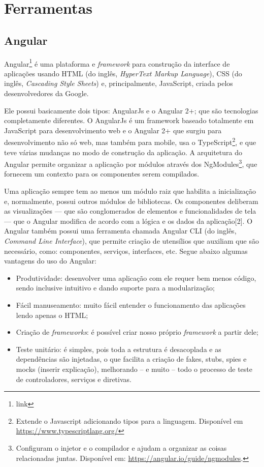 \section{Ferramentas}
\label{sec:ferramentas}

\subsection{Angular}
\label{ssec:Angular}
Angular\footnote{link}\cite{afonso2018angular} é uma plataforma e \textit{framework} para construção da interface de aplicações usando HTML (do inglês, \textit{HyperText Markup Language}), CSS (do inglês, \textit{Cascading Style Sheets}) e, principalmente, JavaScript, criada pelos desenvolvedores da Google. 

Ele possui basicamente dois tipos: AngularJs e o Angular 2+; que são tecnologias completamente diferentes. O AngularJs é um framework baseado totalmente em JavaScript para desenvolvimento web e o Angular 2+ que surgiu para desenvolvimento não só web, mas também para mobile, usa o TypeScript\footnote{Extende o Javascript adicionando tipos para a linguagem. Disponível em \url{https://www.typescriptlang.org/}}, e que teve várias mudanças no modo de construção da aplicação. A arquitetura do Angular permite organizar a aplicação por módulos através dos NgModules\footnote{Configuram o injetor e o compilador e ajudam a organizar as coisas relacionadas juntas. Disponível em: \url{https://angular.io/guide/ngmodules}.}, que fornecem um contexto para os componentes serem compilados. 

Uma aplicação sempre tem ao menos um módulo raiz que habilita a inicialização e, normalmente, possui outros módulos de bibliotecas. Os componentes deliberam as visualizações — que são conglomerados de elementos e funcionalidades de tela — que o Angular modifica de acordo com a lógica e os dados da aplicação[2]. O Angular também possui uma ferramenta chamada Angular CLI (do inglês, \textit{Command Line Interface}), que permite criação de utensílios que auxiliam que são necessário, como: componentes, serviços, interfaces, etc. Segue abaixo algumas vantagens do uso do Angular:  

\begin{itemize}
    \item Produtividade: desenvolver uma aplicação com ele requer bem menos código, sendo inclusive intuitivo e dando suporte para a modularização; 
    \item Fácil manuseamento: muito fácil entender o funcionamento das aplicações lendo apenas o HTML;   
    \item Criação de \textit{frameworks}: é possível criar nosso próprio \textit{framework} a partir dele;   
    \item Teste unitário: é simples, pois toda a estrutura é desacoplada e as dependências são injetadas, o que facilita a criação de fakes, stubs, spies e mocks (inserir explicação), melhorando -- e muito -- todo o processo de teste de controladores, serviços e diretivas. 
\end{itemize}

